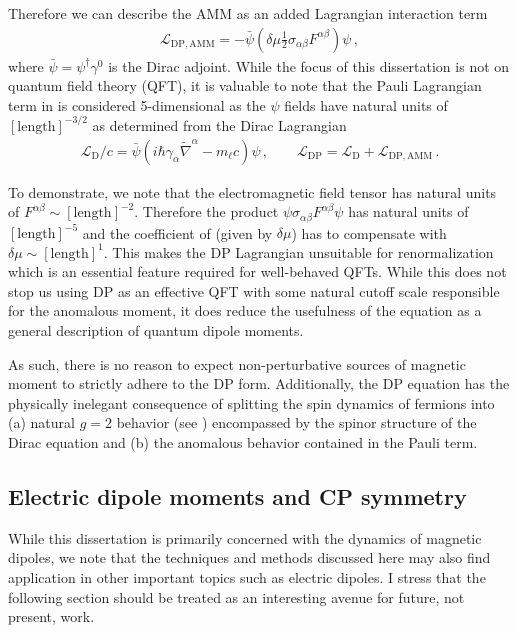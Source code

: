 Therefore we can describe the AMM as an added Lagrangian interaction term
\begin{gather}
    \label{lamm:1}
    \mathcal{L}_\mathrm{DP,AMM} = -{\bar\psi}\left(\delta\mu\frac{1}{2}\sigma_{\alpha\beta}F^{\alpha\beta}\right)\psi\,,
\end{gather}
where ${\bar\psi}=\psi^{\dagger}\gamma^{0}$ is the Dirac adjoint. While the focus of this dissertation is not on quantum field theory (QFT), it is valuable to note that the Pauli Lagrangian term in  is considered 5-dimensional as the $\psi$ fields have natural units of $[\mathrm{length}]^{-3/2}$ as determined from the Dirac Lagrangian
\begin{gather}
    \label{ld:1}
    \mathcal{L}_\mathrm{D}/c=\bar\psi\left(i\hbar\gamma_{\alpha}\widetilde\nabla^{\alpha}-m_{\ell}c\right)\psi\,,\qquad \mathcal{L}_\mathrm{DP} = \mathcal{L}_\mathrm{D} + \mathcal{L}_\mathrm{DP,AMM}\,.
\end{gather}

To demonstrate, we note that the electromagnetic field tensor has natural units of $F^{\alpha\beta}\sim[\mathrm{length}]^{-2}$. Therefore the product $\psi\sigma_{\alpha\beta}F^{\alpha\beta}\psi$ has natural units of $[\mathrm{length}]^{-5}$ and the coefficient of  (given by $\delta\mu$) has to compensate with $\delta\mu\sim[\mathrm{length}]^{1}$. This makes the DP Lagrangian unsuitable for renormalization which is an essential feature required for well-behaved QFTs. While this does not stop us using DP as an effective QFT with some natural cutoff scale responsible for the anomalous moment, it does reduce the usefulness of the equation as a general description of quantum dipole moments.

As such, there is no reason to expect non-perturbative sources of magnetic moment to strictly adhere to the DP form. Additionally, the DP equation has the physically inelegant consequence of splitting the spin dynamics of fermions into (a) natural $g\!=\!2$ behavior (see ) encompassed by the spinor structure of the Dirac equation and (b) the anomalous behavior contained in the Pauli term.

\subsection{Electric dipole moments and CP symmetry}
\label{sec:edm}
\noindent While this dissertation is primarily concerned with the dynamics of magnetic dipoles, we note that the techniques and methods discussed here may also find application in other important topics such as electric dipoles. I stress that the following section should be treated as an interesting avenue for future, not present, work.

